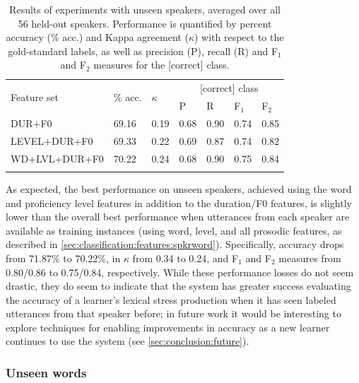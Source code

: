 	
	\begin{table}
			\centering
			\caption[Results of experiments with unseen speakers]{Results of experiments with unseen speakers, averaged over all 56 held-out speakers.
			Performance is quantified by percent accuracy (\% acc.) and Kappa agreement ($\kappa$) with respect to the gold-standard labels, as well as precision (P), recall (R) and F$_1$ and F$_2$ measures for the [correct] class. 
			 }
			\begin{tabularx}{.8\textwidth}{lXXXXXX}		
			\toprule
			\multirow{2}{*}{Feature set} & \multirow{2}{*}{\% acc.} & \multirow{2}{*}{$\kappa$} & \multicolumn{4}{c}{[correct] class} \\
			\cmidrule(lr){4-7}
			& & & P & R & F$_1$ & F$_2$ \\
			\midrule
DUR+F0	&	69.16	&	0.19	&	0.68	&	0.90	&	0.74	&	0.85	\\
{LEVEL+DUR+F0}	&	69.33	&	0.22	&	0.69	&	0.87	&	0.74	&	0.82	\\
{WD+LVL+DUR+F0}	&	70.22	&	0.24	&	0.68	&	0.90	&	0.75	&	0.84	\\							
			\bottomrule
			\label{tab:results:speakers}
			\end{tabularx}
		\end{table}
		
		As expected, the best performance on unseen speakers, achieved using the word and proficiency level features in addition to the duration/F0 features, is slightly lower than the overall best performance when utterances from each speaker are available as training instances (using word, level, and all prosodic features, as described in \cref{sec:classification:features:spkrword}). Specifically, accuracy drops from 71.87\% to 70.22\%, in $\kappa$ from 0.34 to 0.24, and F$_1$ and F$_2$ measures from 0.80/0.86 to 0.75/0.84, respectively. While these performance losses do not seem drastic, they do seem to indicate that the system has greater success evaluating the accuracy of a learner's lexical stress production when it has seen  labeled utterances from that speaker before; in future work it would be interesting to explore techniques for enabling improvements in accuracy as a new learner continues to use the system (see \cref{sec:conclusion:future}).
		
		
		
		\subsubsection{Unseen words}
	
